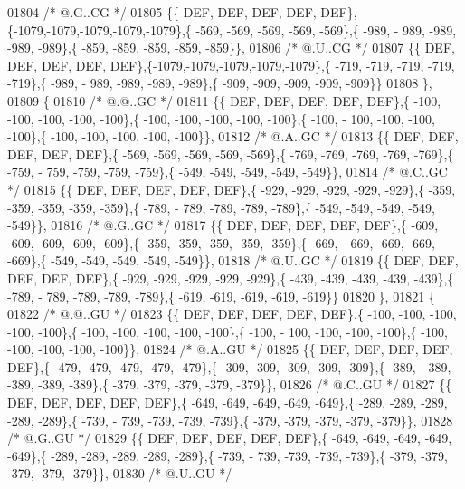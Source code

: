 \begin{DoxyCode}
01804 \textcolor{comment}{/*  @.G..CG */}
01805 \{\{  DEF,  DEF,  DEF,  DEF,  DEF\},\{-1079,-1079,-1079,-1079,-1079\},\{ -569, -569, -569, -569, -569\},\{ -989, -
      989, -989, -989, -989\},\{ -859, -859, -859, -859, -859\}\},
01806 \textcolor{comment}{/*  @.U..CG */}
01807 \{\{  DEF,  DEF,  DEF,  DEF,  DEF\},\{-1079,-1079,-1079,-1079,-1079\},\{ -719, -719, -719, -719, -719\},\{ -989, -
      989, -989, -989, -989\},\{ -909, -909, -909, -909, -909\}\}
01808 \},
01809 \{
01810 \textcolor{comment}{/*  @.@..GC */}
01811 \{\{  DEF,  DEF,  DEF,  DEF,  DEF\},\{ -100, -100, -100, -100, -100\},\{ -100, -100, -100, -100, -100\},\{ -100, -
      100, -100, -100, -100\},\{ -100, -100, -100, -100, -100\}\},
01812 \textcolor{comment}{/*  @.A..GC */}
01813 \{\{  DEF,  DEF,  DEF,  DEF,  DEF\},\{ -569, -569, -569, -569, -569\},\{ -769, -769, -769, -769, -769\},\{ -759, -
      759, -759, -759, -759\},\{ -549, -549, -549, -549, -549\}\},
01814 \textcolor{comment}{/*  @.C..GC */}
01815 \{\{  DEF,  DEF,  DEF,  DEF,  DEF\},\{ -929, -929, -929, -929, -929\},\{ -359, -359, -359, -359, -359\},\{ -789, -
      789, -789, -789, -789\},\{ -549, -549, -549, -549, -549\}\},
01816 \textcolor{comment}{/*  @.G..GC */}
01817 \{\{  DEF,  DEF,  DEF,  DEF,  DEF\},\{ -609, -609, -609, -609, -609\},\{ -359, -359, -359, -359, -359\},\{ -669, -
      669, -669, -669, -669\},\{ -549, -549, -549, -549, -549\}\},
01818 \textcolor{comment}{/*  @.U..GC */}
01819 \{\{  DEF,  DEF,  DEF,  DEF,  DEF\},\{ -929, -929, -929, -929, -929\},\{ -439, -439, -439, -439, -439\},\{ -789, -
      789, -789, -789, -789\},\{ -619, -619, -619, -619, -619\}\}
01820 \},
01821 \{
01822 \textcolor{comment}{/*  @.@..GU */}
01823 \{\{  DEF,  DEF,  DEF,  DEF,  DEF\},\{ -100, -100, -100, -100, -100\},\{ -100, -100, -100, -100, -100\},\{ -100, -
      100, -100, -100, -100\},\{ -100, -100, -100, -100, -100\}\},
01824 \textcolor{comment}{/*  @.A..GU */}
01825 \{\{  DEF,  DEF,  DEF,  DEF,  DEF\},\{ -479, -479, -479, -479, -479\},\{ -309, -309, -309, -309, -309\},\{ -389, -
      389, -389, -389, -389\},\{ -379, -379, -379, -379, -379\}\},
01826 \textcolor{comment}{/*  @.C..GU */}
01827 \{\{  DEF,  DEF,  DEF,  DEF,  DEF\},\{ -649, -649, -649, -649, -649\},\{ -289, -289, -289, -289, -289\},\{ -739, -
      739, -739, -739, -739\},\{ -379, -379, -379, -379, -379\}\},
01828 \textcolor{comment}{/*  @.G..GU */}
01829 \{\{  DEF,  DEF,  DEF,  DEF,  DEF\},\{ -649, -649, -649, -649, -649\},\{ -289, -289, -289, -289, -289\},\{ -739, -
      739, -739, -739, -739\},\{ -379, -379, -379, -379, -379\}\},
01830 \textcolor{comment}{/*  @.U..GU */}

\end{DoxyCode}

